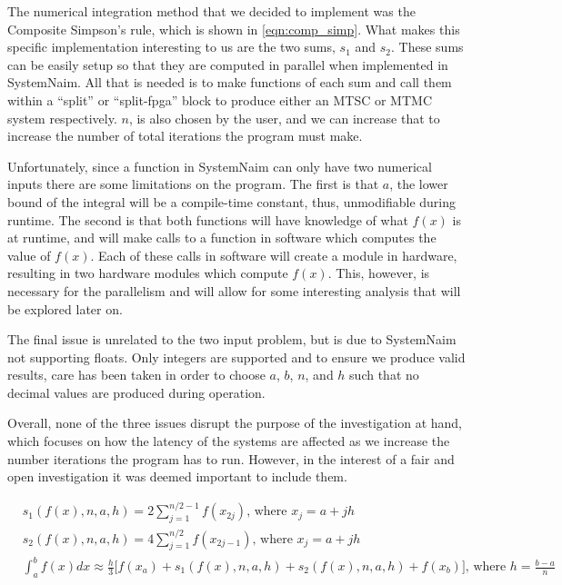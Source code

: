 The numerical integration method that we decided to implement was the Composite Simpson's rule, which is shown in \autoref{eqn:comp_simp}. What makes this specific implementation interesting to us are the two sums, $s_1$ and $s_2$. These sums can be easily setup so that they are computed in parallel when implemented in SystemNaim. All that is needed is to make functions of each sum and call them within a “split” or “split-fpga” block to produce either an MTSC or MTMC system respectively. $n$, is also chosen by the user, and we can increase that to increase the number of total iterations the program must make.

Unfortunately, since a function in SystemNaim can only have two numerical inputs there are some limitations on the program. The first is that $a$, the lower bound of the integral will be a compile-time constant, thus, unmodifiable during runtime. The second is that both functions will have knowledge of what $f(x)$ is at runtime, and will make calls to a function in software which computes the value of $f(x)$. Each of these calls in software will create a module in hardware, resulting in two hardware modules which compute $f(x)$. This, however, is necessary for the parallelism and will allow for some interesting analysis that will be explored later on.

The final issue is unrelated to the two input problem, but is due to SystemNaim not supporting floats. Only integers are supported and to ensure we produce valid results, care has been taken in order to choose $a$, $b$, $n$, and $h$ such that no decimal values are produced during operation.

Overall, none of the three issues disrupt the purpose of the investigation at hand, which focuses on how the latency of the systems are affected as we increase the number iterations the program has to run. However, in the interest of a fair and open investigation it was deemed important to include them.

\begin{align}
    & s_1(f(x),n,a,h) = 2 \sum_{j=1}^{n/2-1}f(x_{2j}) \text{, where } x_j = a + jh \\
    & s_2(f(x),n,a,h) = 4 \sum_{j=1}^{n/2}f(x_{2j-1}) \text{, where } x_j = a + jh \\
    &\int_{a}^{b} f(x) dx \approx \frac{h}{3} \Big[ f(x_a) + s_1(f(x),n,a,h) + s_2(f(x),n,a,h) + f(x_b) \Big] \text{, where } h = \frac{b-a}{n}  \label{eqn:comp_simp}
\end{align}

